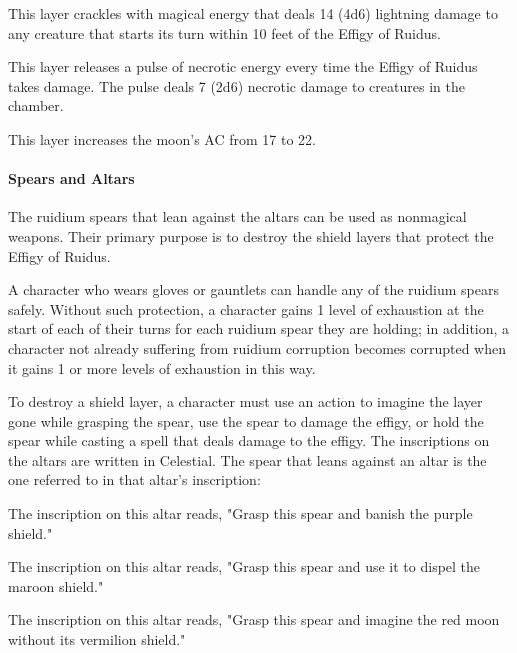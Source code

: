 \documentclass[10pt,a4paper,twoside,twocolumn,openany,nodeprecatedcode]{dndbook}
\begin{document}
\begin{description}[nolistsep]
\item[Purple Layer.]
This layer crackles with magical energy that deals 14 (4d6) lightning damage to any creature that starts its turn within 10 feet of the Effigy of Ruidus.
\item[Maroon Layer.]
This layer releases a pulse of necrotic energy every time the Effigy of Ruidus takes damage. The pulse deals 7 (2d6) necrotic damage to creatures in the chamber.
\item[Vermilion Layer.]
This layer increases the moon's AC from 17 to 22.
\end{description}

\paragraph{Spears and Altars}
The ruidium spears that lean against the altars can be used as nonmagical weapons. Their primary purpose is to destroy the shield layers that protect the Effigy of Ruidus.

A character who wears gloves or gauntlets can handle any of the ruidium spears safely. Without such protection, a character gains 1 level of exhaustion at the start of each of their turns for each ruidium spear they are holding; in addition, a character not already suffering from ruidium corruption becomes corrupted when it gains 1 or more levels of exhaustion in this way.

To destroy a shield layer, a character must use an action to imagine the layer gone while grasping the spear, use the spear to damage the effigy, or hold the spear while casting a spell that deals damage to the effigy. The inscriptions on the altars are written in Celestial. The spear that leans against an altar is the one referred to in that altar's inscription:


\begin{description}[nolistsep]
\item[Altar of Avandra (Northwest of the Effigy).]
The inscription on this altar reads, "Grasp this spear and banish the purple shield."
\item[Altar of Corellon (Southwest of the Effigy).]
The inscription on this altar reads, "Grasp this spear and use it to dispel the maroon shield."
\item[Altar of Sehanine (East of the Effigy).]
The inscription on this altar reads, "Grasp this spear and imagine the red moon without its vermilion shield."
\end{description}
\end{document}
